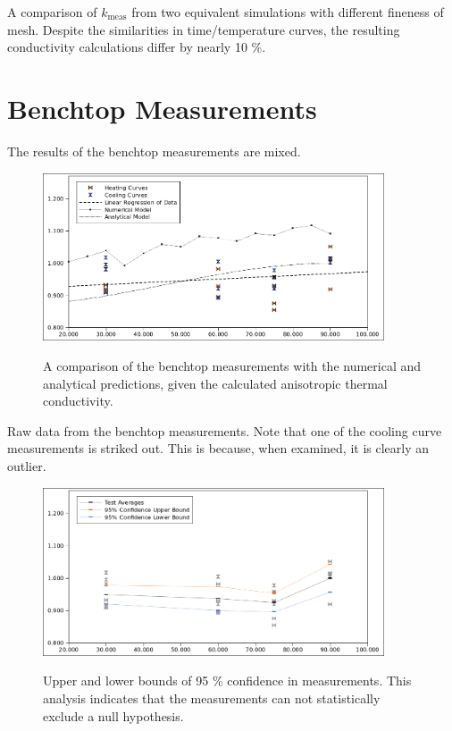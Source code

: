 \begin{table}[h]
\centering

\label{tab:conv_kvals}
\caption{A comparison of \(k_{\textrm{meas}}\) from two equivalent simulations 
with different fineness of mesh. Despite the similarities in time/temperature
curves, the resulting  conductivity calculations differ by nearly 10 \%.}
\end{table}

\section{Benchtop Measurements}

The results of the benchtop measurements are mixed.

\begin{figure}[h]
\centering
\includegraphics[width=0.9\textwidth]{fig/test_results.png}
\label{fig:test_results}
\caption{A comparison of the benchtop measurements with the numerical and
analytical predictions, given the calculated anisotropic thermal conductivity.}
\end{figure}

\begin{table}[h]
\centering

\label{tab:powders}
\caption{Raw data from the benchtop measurements. Note that one of the cooling curve measurements is striked out. This is because, when examined, it is clearly an outlier.}
\end{table}


\begin{figure}[h]
\centering
\includegraphics[width=0.9\textwidth]{fig/test_results_confidence.png}
\label{fig:test_confidence}
\caption{Upper and lower bounds of 95 \% confidence in measurements. This analysis 
indicates that the measurements can not statistically exclude a null hypothesis.}
\end{figure}

